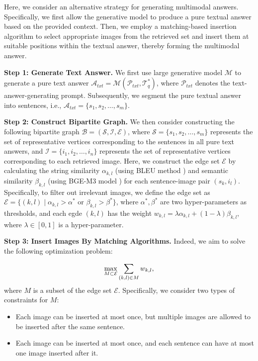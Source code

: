 Here, we consider an alternative strategy for generating multimodal answers. Specifically, we first allow the generative model to produce a pure textual answer based on the provided context. Then, we employ a matching-based insertion algorithm to select appropriate images from the retrieved set and insert them at suitable positions within the textual answer, thereby forming the multimodal answer.

\textbf{Step 1: Generate Text Answer.} We first use large generative model $\mathcal{M}$ to generate a pure text answer $\mathcal{A}_{txt}=\mathcal{M}(\mathcal{P}_{txt},\mathcal{T}_q^*)$, where $\mathcal{P}_{txt}$ denotes the text-answer-generating prompt. Subsequently, we segment the pure textual answer into sentences, i.e., $\mathcal{A}_{txt} = \{s_1, s_2, \dots, s_m\}$. 

\textbf{Step 2: Construct Bipartite Graph.} We then consider constructing the following bipartite graph $\mathcal{B} = (\mathcal{S}, \mathcal{I}, \mathcal{E})$, where $\mathcal{S} = \{s_1, s_2, \dots, s_m\}$ represents the set of representative vertices corresponding to the sentences in all pure text answers, and $\mathcal{I} = \{i_1, i_2, \dots, i_n\}$ represents the set of representative vertices corresponding to each retrieved image. Here, we construct the edge set $\mathcal{E}$ by calculating the string similarity $\alpha_{k,l}$ (using BLEU method \citep{papineni2002bleu}) and semantic similarity $\beta_{k,l}$ (using BGE-M3 model \citep{chen2024bge}) for each sentence-image pair $(s_k, i_l)$. Specifically, to filter out irrelevant images, we define the edge set as $\mathcal{E} = \{(k, l) \mid \alpha_{k,l} > \alpha^* \text{ or } \beta_{k,l} > \beta^*\}$, where $\alpha^*, \beta^*$ are two hyper-parameters as thresholds, and each egde $(k,l)$ has the weight $w_{k,l} = \lambda\alpha_{k,l} + (1-\lambda)\beta_{k,l}$, where $\lambda\in [0,1]$ is a hyper-parameter.

\textbf{Step 3: Insert Images By Matching Algorithms.} Indeed, we aim to solve the following optimization problem:

\begin{equation}
\label{problem:matching}
    \operatornamewithlimits{max}_{M \subset \mathcal{E}} \sum_{(k,l) \in M} w_{k,l} ,
\end{equation}
where $M$ is a subset of the edge set $\mathcal{E}$. Specifically, we consider two types of constraints for $M$:

\begin{itemize}
    \item Each image can be inserted at most once, but multiple images are allowed to be inserted after the same sentence.
    \item Each image can be inserted at most once, and each sentence can have at most one image inserted after it.
\end{itemize}

